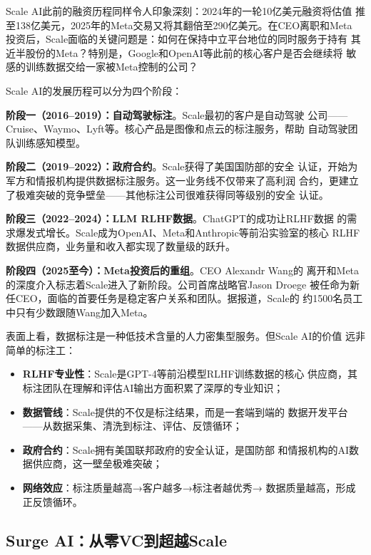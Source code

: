Scale AI此前的融资历程同样令人印象深刻：2024年的一轮10亿美元融资将估值
推至138亿美元，2025年的Meta交易又将其翻倍至290亿美元。在CEO离职和Meta
投资后，Scale面临的关键问题是：如何在保持中立平台地位的同时服务于持有
其近半股份的Meta？特别是，Google和OpenAI等此前的核心客户是否会继续将
敏感的训练数据交给一家被Meta控制的公司？

Scale AI的发展历程可以分为四个阶段：

\textbf{阶段一（2016--2019）：自动驾驶标注}。Scale最初的客户是自动驾驶
公司——Cruise、Waymo、Lyft等。核心产品是图像和点云的标注服务，帮助
自动驾驶团队训练感知模型。

\textbf{阶段二（2019--2022）：政府合约}。Scale获得了美国国防部的安全
认证，开始为军方和情报机构提供数据标注服务。这一业务线不仅带来了高利润
合约，更建立了极难突破的竞争壁垒——其他标注公司很难获得同等级别的安全
认证。

\textbf{阶段三（2022--2024）：LLM RLHF数据}。ChatGPT的成功让RLHF数据
的需求爆发式增长。Scale成为OpenAI、Meta和Anthropic等前沿实验室的核心
RLHF数据供应商，业务量和收入都实现了数量级的跃升。

\textbf{阶段四（2025至今）：Meta投资后的重组}。CEO Alexandr Wang的
离开和Meta的深度介入标志着Scale进入了新阶段。公司首席战略官Jason Droege
被任命为新任CEO，面临的首要任务是稳定客户关系和团队。据报道，Scale的
约1500名员工中只有少数跟随Wang加入Meta。

\begin{whybox}
表面上看，数据标注是一种低技术含量的人力密集型服务。但Scale AI的价值
远非简单的标注工：
\begin{itemize}
  \item \textbf{RLHF专业性}：Scale是GPT-4等前沿模型RLHF训练数据的核心
    供应商，其标注团队在理解和评估AI输出方面积累了深厚的专业知识；
  \item \textbf{数据管线}：Scale提供的不仅是标注结果，而是一套端到端的
    数据开发平台——从数据采集、清洗到标注、评估、反馈循环；
  \item \textbf{政府合约}：Scale拥有美国联邦政府的安全认证，是国防部
    和情报机构的AI数据供应商，这一壁垒极难突破；
  \item \textbf{网络效应}：标注质量越高→客户越多→标注者越优秀→
    数据质量越高，形成正反馈循环。
\end{itemize}
\end{whybox}

\subsection{Surge AI：从零VC到超越Scale}
\label{subsec:surge-ai}

